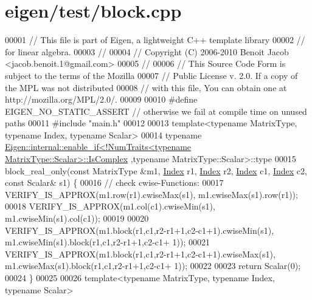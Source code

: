 \hypertarget{eigen_2test_2block_8cpp_source}{}\section{eigen/test/block.cpp}
\label{eigen_2test_2block_8cpp_source}

\begin{DoxyCode}
00001 \textcolor{comment}{// This file is part of Eigen, a lightweight C++ template library}
00002 \textcolor{comment}{// for linear algebra.}
00003 \textcolor{comment}{//}
00004 \textcolor{comment}{// Copyright (C) 2006-2010 Benoit Jacob <jacob.benoit.1@gmail.com>}
00005 \textcolor{comment}{//}
00006 \textcolor{comment}{// This Source Code Form is subject to the terms of the Mozilla}
00007 \textcolor{comment}{// Public License v. 2.0. If a copy of the MPL was not distributed}
00008 \textcolor{comment}{// with this file, You can obtain one at http://mozilla.org/MPL/2.0/.}
00009 
00010 \textcolor{preprocessor}{#define EIGEN\_NO\_STATIC\_ASSERT // otherwise we fail at compile time on unused paths}
00011 \textcolor{preprocessor}{#include "main.h"}
00012 
00013 \textcolor{keyword}{template}<\textcolor{keyword}{typename} MatrixType, \textcolor{keyword}{typename} Index, \textcolor{keyword}{typename} Scalar>
00014 \textcolor{keyword}{typename} 
      \hyperlink{struct_eigen_1_1internal_1_1enable__if}{Eigen::internal::enable\_if<!NumTraits<typename MatrixType::Scalar>::IsComplex}
      ,\textcolor{keyword}{typename} MatrixType::Scalar>::type
00015 block\_real\_only(\textcolor{keyword}{const} MatrixType &m1, \hyperlink{namespace_eigen_a62e77e0933482dafde8fe197d9a2cfde}{Index} r1, \hyperlink{namespace_eigen_a62e77e0933482dafde8fe197d9a2cfde}{Index} r2, \hyperlink{namespace_eigen_a62e77e0933482dafde8fe197d9a2cfde}{Index} c1, 
      \hyperlink{namespace_eigen_a62e77e0933482dafde8fe197d9a2cfde}{Index} c2, \textcolor{keyword}{const} Scalar& s1) \{
00016   \textcolor{comment}{// check cwise-Functions:}
00017   VERIFY\_IS\_APPROX(m1.row(r1).cwiseMax(s1), m1.cwiseMax(s1).row(r1));
00018   VERIFY\_IS\_APPROX(m1.col(c1).cwiseMin(s1), m1.cwiseMin(s1).col(c1));
00019 
00020   VERIFY\_IS\_APPROX(m1.block(r1,c1,r2-r1+1,c2-c1+1).cwiseMin(s1), m1.cwiseMin(s1).block(r1,c1,r2-r1+1,c2-c1+
      1));
00021   VERIFY\_IS\_APPROX(m1.block(r1,c1,r2-r1+1,c2-c1+1).cwiseMax(s1), m1.cwiseMax(s1).block(r1,c1,r2-r1+1,c2-c1+
      1));
00022   
00023   \textcolor{keywordflow}{return} Scalar(0);
00024 \}
00025 
00026 \textcolor{keyword}{template}<\textcolor{keyword}{typename} MatrixType, \textcolor{keyword}{typename} Index, \textcolor{keyword}{typename} Scalar>

\end{DoxyCode}
